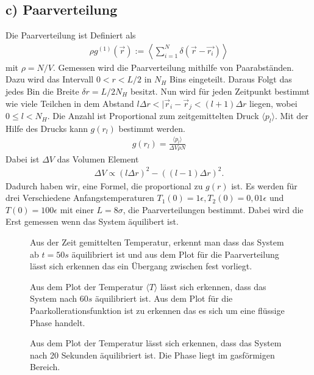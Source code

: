 \subsection*{c) Paarverteilung}
Die Paarverteilung ist Definiert als
\begin{align*}
	\rho g^{(1)}(\vec{r}):=\left< \sum\limits_{i=1}^{N}\delta(\vec{r}-\vec{r_i})\right>
\end{align*}
mit $\rho=N/V$.
Gemessen wird die Paarverteilung mithilfe von Paarabständen.
Dazu wird das Intervall $0<r<L/2$ in $N_H$ Bins eingeteilt.
Daraus Folgt das jedes Bin die Breite $\delta r= L/2N_H$ besitzt.
Nun wird für jeden Zeitpunkt bestimmt wie viele Teilchen in dem Abstand $l\Delta r < |\vec{r}_i-\vec{r}_j<(l+1)\Delta r$ liegen, wobei $0\le l < N_H$.
Die Anzahl ist Proportional zum zeitgemittelten Druck $\langle p_l \rangle$.
Mit der Hilfe des Drucks kann $g(r_l)$ bestimmt werden.
\begin{align}
	g(r_l)=\frac{\langle p_l\rangle}{\Delta V\rho N}
\end{align}
Dabei ist $\Delta V$ das Volumen Element
\begin{align*}
	\Delta V \propto (l\Delta r)^2-((l-1)\Delta r)^2.
\end{align*}
Dadurch haben wir, eine Formel, die proportional zu $g(r)$ ist.
Es werden für drei Verschiedene Anfangstemperaturen $T_1(0)=1\epsilon,T_2(0)=0,01\epsilon$ und $T(0)=100\epsilon$ mit einer $L=8\sigma$, die Paarverteilungen bestimmt.
Dabei wird die Erst gemessen wenn das System äquilibert ist.
\begin{figure}[h!]
	\centering
	\caption{Aus der Zeit gemittelten Temperatur, erkennt man dass das System ab $t=50s$ äquilibriert ist und aus dem Plot für die Paarverteilung lässt sich erkennen das ein Übergang zwischen fest vorliegt.}
	\caption{}
\end{figure}
\begin{figure}[h!]
	\centering
	\caption{Aus dem Plot der Temperatur $\langle T\rangle$ lässt sich erkennen, dass das System nach $60s$ äquilibriert ist. Aus dem Plot für die Paarkollerationsfunktion ist zu erkennen das es sich um eine flüssige Phase handelt.}
\end{figure}
\begin{figure}[h!]
	\centering
	\caption{Aus dem Plot der Temperatur lässt sich erkennen, dass das System nach 20 Sekunden äquilibriert ist. Die Phase liegt im gasförmigen Bereich.}
\end{figure}\newpage
